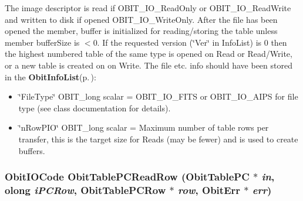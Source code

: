 The image descriptor is read if OBIT\_\-IO\_\-Read\-Only or OBIT\_\-IO\_\-Read\-Write and written to disk if opened OBIT\_\-IO\_\-Write\-Only. After the file has been opened the member, buffer is initialized for reading/storing the table unless member buffer\-Size is $<$0. If the requested version (\char`\"{}Ver\char`\"{} in Info\-List) is 0 then the highest numbered table of the same type is opened on Read or Read/Write, or a new table is created on on Write. The file etc. info should have been stored in the {\bf Obit\-Info\-List}{\rm (p.\,\pageref{structObitInfoList})}: \begin{itemize}
\item \char`\"{}File\-Type\char`\"{} OBIT\_\-long scalar = OBIT\_\-IO\_\-FITS or OBIT\_\-IO\_\-AIPS for file type (see class documentation for details). \item \char`\"{}n\-Row\-PIO\char`\"{} OBIT\_\-long scalar = Maximum number of table rows per transfer, this is the target size for Reads (may be fewer) and is used to create buffers. 
\end{itemize}
\subsubsection{\setlength{\rightskip}{0pt plus 5cm}Obit\-IOCode Obit\-Table\-PCRead\-Row ({\bf Obit\-Table\-PC} $\ast$ {\em in}, {\bf olong} {\em i\-PCRow}, {\bf Obit\-Table\-PCRow} $\ast$ {\em row}, {\bf Obit\-Err} $\ast$ {\em err})}\label{ObitTablePC_8h_a18}


